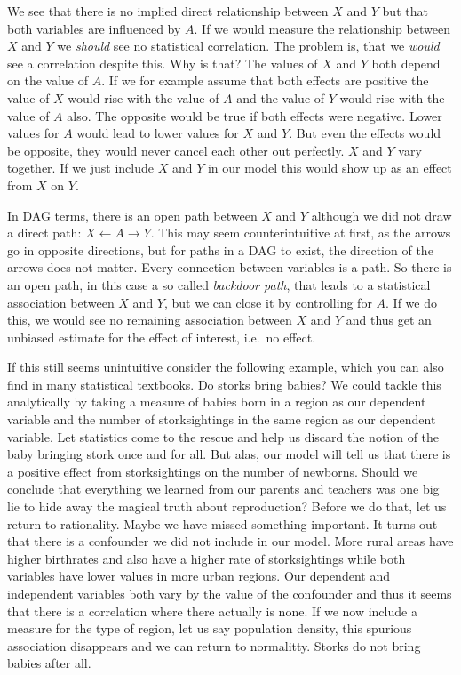 \documentclass[
]{book}
\begin{document}
We see that there is no implied direct relationship between \(X\) and \(Y\) but that
both variables are influenced by \(A\). If we would measure the relationship
between \(X\) and \(Y\) we \emph{should} see no statistical correlation. The problem is,
that we \emph{would} see a correlation despite this. Why is that?
The values of \(X\) and \(Y\) both depend on the value of \(A\). If we for example
assume that both effects are positive the value of \(X\) would rise with the value
of \(A\) and the value of \(Y\) would rise with the value of \(A\) also.
The opposite would be true if both effects were negative. Lower values for \(A\)
would lead to lower values for \(X\) and \(Y\).
But even the effects would be opposite, they would never cancel each other out
perfectly. \(X\) and \(Y\) vary together.
If we just include \(X\) and \(Y\) in our model this would show up as an
effect from \(X\) on \(Y\).

In DAG terms, there is an open path between \(X\) and \(Y\) although we did not
draw a direct path: \(X \leftarrow A \rightarrow Y\). This may seem
counterintuitive at first, as the arrows go in opposite directions, but for
paths in a DAG to exist, the direction of the arrows does not matter. Every
connection between variables is a path. So there is an open path, in this case
a so called \emph{backdoor path}, that leads to a statistical association between
\(X\) and \(Y\), but we can close it by controlling for \(A\). If we do this, we would
see no remaining association between \(X\) and \(Y\) and thus get an unbiased
estimate for the effect of interest, i.e.~no effect.

If this still seems unintuitive consider the following example, which you can
also find in many statistical textbooks. Do storks bring babies? We could tackle
this analytically by taking a measure of babies born in a region as our dependent
variable and the number of storksightings in the same region as our dependent
variable. Let statistics come to the rescue and help us discard the notion of
the baby bringing stork once and for all. But alas, our model will tell us that
there is a positive effect from storksightings on the number of newborns. Should
we conclude that everything we learned from our parents and teachers was one big
lie to hide away the magical truth about reproduction? Before we do that, let us
return to rationality. Maybe we have missed something important. It turns out
that there is a confounder we did not include in our model. More rural areas
have higher birthrates and also have a higher rate of storksightings while both
variables have lower values in more urban regions. Our dependent and independent
variables both vary by the value of the confounder and thus it seems that there
is a correlation where there actually is none. If we now include a measure for
the type of region, let us say population density, this spurious association
disappears and we can return to normalitty. Storks do not bring babies after all.
\end{document}

